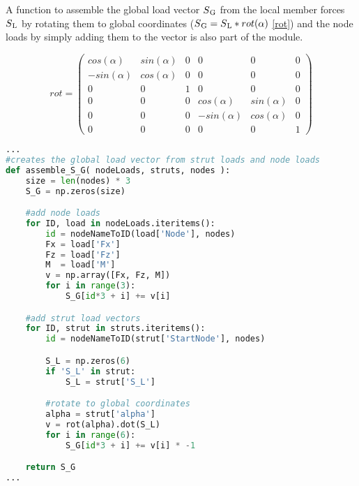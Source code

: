 A function to assemble the global load vector $S\textsubscript{G}$ from the local member forces $S\textsubscript{L}$ by rotating them to global coordinates ($S\textsubscript{G} = S\textsubscript{L} * rot(\alpha)$ \ref{rot}) and the node loads by simply adding them to the vector is also part of the module.

\begin{equation} \label{rot}
rot = \begin{pmatrix}
cos(\alpha)  & sin(\alpha)  & 0   & 0             & 0             & 0   \\[0.2em]
-sin(\alpha) & cos(\alpha)  & 0   & 0             & 0             & 0   \\[0.2em]
0            & 0            & 1   & 0             & 0             & 0   \\[0.2em]
0            & 0            & 0   & cos(\alpha)   & sin(\alpha)   & 0   \\[0.2em]
0            & 0            & 0   & -sin(\alpha)  & cos(\alpha)   & 0   \\[0.2em]
0            & 0            & 0   & 0             & 0             & 1
     \end{pmatrix}
\end{equation}

\begin{inconsolata}
\begin{lstlisting}[language=python]
...
#creates the global load vector from strut loads and node loads
def assemble_S_G( nodeLoads, struts, nodes ):
    size = len(nodes) * 3
    S_G = np.zeros(size)

    #add node loads
    for ID, load in nodeLoads.iteritems():
        id = nodeNameToID(load['Node'], nodes)
        Fx = load['Fx']
        Fz = load['Fz']
        M  = load['M']
        v = np.array([Fx, Fz, M])
        for i in range(3):
            S_G[id*3 + i] += v[i]

    #add strut load vectors
    for ID, strut in struts.iteritems():
        id = nodeNameToID(strut['StartNode'], nodes)

        S_L = np.zeros(6)
        if 'S_L' in strut:
            S_L = strut['S_L']

        #rotate to global coordinates
        alpha = strut['alpha']
        v = rot(alpha).dot(S_L)
        for i in range(6):
            S_G[id*3 + i] += v[i] * -1

    return S_G
...
\end{lstlisting}
\end{inconsolata}

